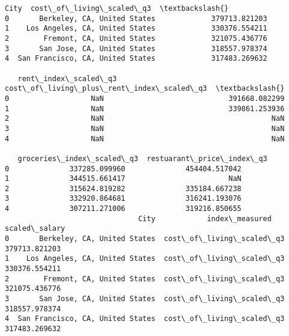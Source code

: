 \documentclass[11pt]{article}
\begin{document}
    \begin{Verbatim}[commandchars=\\\{\}]
                               City  cost\_of\_living\_scaled\_q3  \textbackslash{}
0       Berkeley, CA, United States             379713.821203
1    Los Angeles, CA, United States             330376.554211
2        Fremont, CA, United States             321075.436776
3       San Jose, CA, United States             318557.978374
4  San Francisco, CA, United States             317483.269632

   rent\_index\_scaled\_q3  cost\_of\_living\_plus\_rent\_index\_scaled\_q3  \textbackslash{}
0                   NaN                             391668.082299
1                   NaN                             339861.253936
2                   NaN                                       NaN
3                   NaN                                       NaN
4                   NaN                                       NaN

   groceries\_index\_scaled\_q3  restuarant\_price\_index\_q3
0              337285.099960              454404.517042
1              344515.661417                        NaN
2              315624.819282              335184.667238
3              332920.864681              316241.193076
4              307211.271006              319216.850655
                               City            index\_measured  scaled\_salary
0       Berkeley, CA, United States  cost\_of\_living\_scaled\_q3  379713.821203
1    Los Angeles, CA, United States  cost\_of\_living\_scaled\_q3  330376.554211
2        Fremont, CA, United States  cost\_of\_living\_scaled\_q3  321075.436776
3       San Jose, CA, United States  cost\_of\_living\_scaled\_q3  318557.978374
4  San Francisco, CA, United States  cost\_of\_living\_scaled\_q3  317483.269632
    \end{Verbatim}

    \begin{center}
    \end{center}
    { \hspace*{\fill} \\}
    
\end{document}
